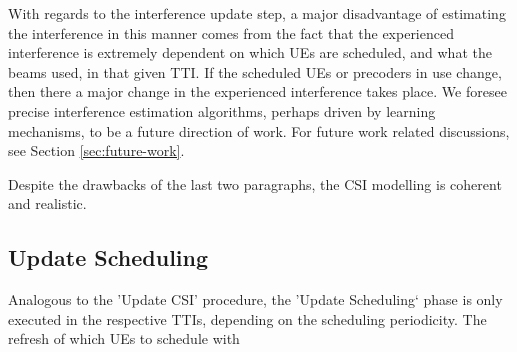 With regards to the interference update step, a major disadvantage of estimating the interference in this manner comes from the fact that the experienced interference is extremely dependent on which UEs are scheduled, and what the beams used, in that given TTI. If the scheduled UEs or precoders in use change, then there a major change in the experienced interference takes place. We foresee precise interference estimation algorithms, perhaps driven by learning mechanisms, to be a future direction of work. For future work related discussions, see Section \ref{sec:future-work}.

Despite the drawbacks of the last two paragraphs, the \ac{CSI} modelling is coherent and realistic. 

\subsection{Update Scheduling}
Analogous to the 'Update CSI' procedure, the 'Update Scheduling` phase is only executed in the respective TTIs, depending on the scheduling periodicity. The refresh of which UEs to schedule with 


